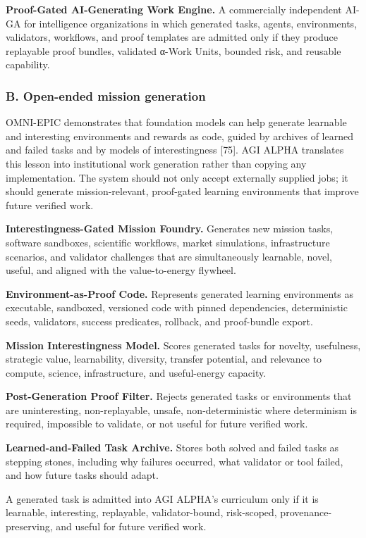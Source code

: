 \textbf{Proof-Gated AI-Generating Work Engine.} A commercially
independent AI-GA for intelligence organizations in which generated
tasks, agents, environments, validators, workflows, and proof templates
are admitted only if they produce replayable proof bundles, validated
α-Work Units, bounded risk, and reusable capability.

\subsubsection{B. Open-ended mission
generation}\label{b.-open-ended-mission-generation}

OMNI-EPIC demonstrates that foundation models can help generate
learnable and interesting environments and rewards as code, guided by
archives of learned and failed tasks and by models of interestingness
{[}75{]}. AGI ALPHA translates this lesson into institutional work
generation rather than copying any implementation. The system should not
only accept externally supplied jobs; it should generate
mission-relevant, proof-gated learning environments that improve future
verified work.

\textbf{Interestingness-Gated Mission Foundry.} Generates new mission
tasks, software sandboxes, scientific workflows, market simulations,
infrastructure scenarios, and validator challenges that are
simultaneously learnable, novel, useful, and aligned with the
value-to-energy flywheel.

\textbf{Environment-as-Proof Code.} Represents generated learning
environments as executable, sandboxed, versioned code with pinned
dependencies, deterministic seeds, validators, success predicates,
rollback, and proof-bundle export.

\textbf{Mission Interestingness Model.} Scores generated tasks for
novelty, usefulness, strategic value, learnability, diversity, transfer
potential, and relevance to compute, science, infrastructure, and
useful-energy capacity.

\textbf{Post-Generation Proof Filter.} Rejects generated tasks or
environments that are uninteresting, non-replayable, unsafe,
non-deterministic where determinism is required, impossible to validate,
or not useful for future verified work.

\textbf{Learned-and-Failed Task Archive.} Stores both solved and failed
tasks as stepping stones, including why failures occurred, what
validator or tool failed, and how future tasks should adapt.

A generated task is admitted into AGI ALPHA's curriculum only if it is
learnable, interesting, replayable, validator-bound, risk-scoped,
provenance-preserving, and useful for future verified work.

